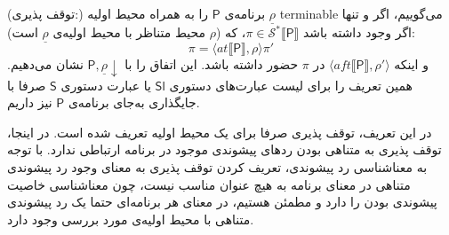 \begin{defn}
(توقف پذیری:) برنامه‌ی $\mathsf{P}$ را به همراه محیط اولیه
 $\underline{\rho}$
  \gls{terminable}
  می‌گوییم، اگر و تنها اگر وجود داشته باشد 
	$\pi \in \mathcal{S}^* \llbracket \mathsf{P} \rrbracket$، 
	که ($\rho$ محیط متناظر با محیط اولیه‌ی $\underline{\rho}$ است):
	$$\pi = \langle at \llbracket \mathsf{P} \rrbracket , \rho \rangle \pi'$$
	و اینکه $\langle aft\llbracket \mathsf{P} \rrbracket , \rho' \rangle$ در $\pi$ حضور داشته باشد. این اتفاق را با 
	$\mathsf{P,\underline{\rho}\downarrow}$
	نشان می‌دهیم. همین تعریف را برای لیست عبارت‌های دستوری $\mathsf{Sl}$ یا عبارت‌ دستوری $\mathsf{S}$ صرفا با جایگذاری به‌جای برنامه‌ی $\mathsf{P}$ نیز داریم.
\end{defn} 
در این تعریف، توقف پذیری صرفا برای یک محیط اولیه تعریف شده است.
در اینجا، توقف پذیری به متناهی بودن ردهای پیشوندی موجود در برنامه ارتباطی ندارد. با توجه به معناشناسی‌ رد پیشوندی، تعریف کردن توقف پذیری به معنای وجود رد پیشوندی متناهی در معنای برنامه به هیچ عنوان مناسب نیست، چون معناشناسی خاصیت پیشوندی بودن را دارد و مطمئن هستیم، در معنای هر برنامه‌ای حتما یک رد پیشوندی متناهی با محیط اولیه‌ی مورد بررسی وجود دارد.

